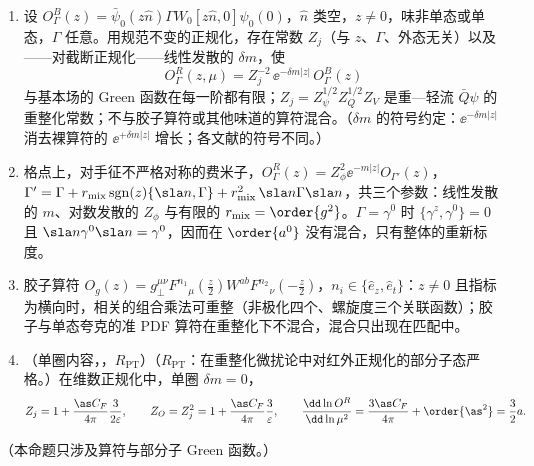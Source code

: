 \begin{proposition}\label{prop:lattice-renormalizability}
\begin{enumerate}[label=(\alph*),leftmargin=2em,itemsep=1pt,topsep=2pt]
\item 设 $O^B_\Gamma(z)=\bar\psi_0(z\hat n)\Gamma W_0[z\hat n,0]\psi_0(0)$，$\hat n$ 类空，$z\neq0$，味非单态或单态，$\Gamma$ 任意。用规范不变的正规化，存在常数 $Z_j$（与 $z$、$\Gamma$、外态无关）以及——对截断正规化——线性发散的 $\delta m$，使
\begin{equation}\label{eq:lamet-multren}
O^R_\Gamma(z,\mu)=Z_j^{-2}\,\ee^{-\delta m|z|}\,O^B_\Gamma(z)
\end{equation}
与基本场的 Green 函数在每一阶都有限；$Z_j=Z_\psi^{1/2}Z_Q^{1/2}Z_V$ 是重—轻流 $\bar Q\psi$ 的重整化常数；不与胶子算符或其他味道的算符混合。（$\delta m$ 的符号约定：$\ee^{-\delta m|z|}$ 消去裸算符的 $\ee^{+\delta m|z|}$ 增长；各文献的符号不同。）%
\item 格点上，对手征不严格对称的费米子，$O^R_\Gamma(z)=Z_\phi^2\ee^{-m|z|}O_{\Gamma'}(z)$，$\Gamma'=\Gamma+r_{\rm mix}\,{\rm sgn}(z)\{\sla n,\Gamma\}+r_{\rm mix}^2\,\sla n\Gamma\sla n$，共三个参数：线性发散的 $m$、对数发散的 $Z_\phi$ 与有限的 $r_{\rm mix}=\order{g^2}$。$\Gamma=\gamma^0$ 时 $\{\gamma^z,\gamma^0\}=0$ 且 $\sla n\gamma^0\sla n=\gamma^0$，因而在 $\order{a^0}$ 没有混合，只有整体的重新标度。
\item 胶子算符 $O_g(z)=g_\perp^{\mu\nu}F^{n_1}{}_\mu(\tfrac z2)W^{ab}F^{n_2}{}_\nu(-\tfrac z2)$，$n_i\in\{\hat e_z,\hat e_t\}$：$z\neq0$ 且指标为横向时，相关的组合乘法可重整（非极化四个、螺旋度三个关联函数）；胶子与单态夸克的准 PDF 算符在重整化下不混合，混合只出现在匹配中。
\item （单圈内容，\tagR，$R_{\mathrm{PT}}$）（$R_{\mathrm{PT}}$：在重整化微扰论中对红外正规化的部分子态严格。）在维数正规化中，单圈 $\delta m=0$，
\begin{equation}\label{eq:lamet-Zj}
Z_j=1+\frac{\as C_F}{4\pi}\frac3{2\varepsilon},\qquad Z_O=Z_j^2=1+\frac{\as C_F}{4\pi}\frac3\varepsilon,\qquad\frac{\dd\ln O^R}{\dd\ln\mu^2}=\frac{3\as C_F}{4\pi}+\order{\as^2}=\frac32a .
\end{equation}
\end{enumerate}
（本命题只涉及算符与部分子 Green 函数。）
\end{proposition}

